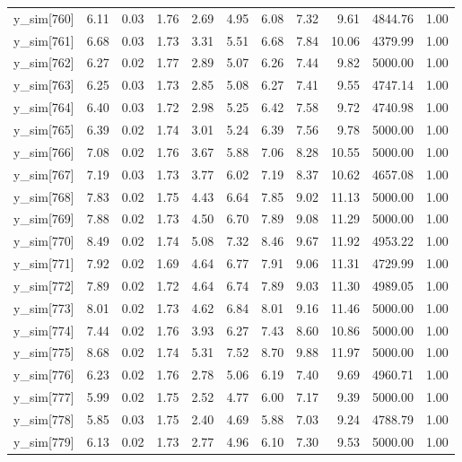 \begin{table}[ht]
\begin{tabular}{rrrrrrrrrrr}
  y\_sim[760] & 6.11 & 0.03 & 1.76 & 2.69 & 4.95 & 6.08 & 7.32 & 9.61 & 4844.76 & 1.00 \\ 
  y\_sim[761] & 6.68 & 0.03 & 1.73 & 3.31 & 5.51 & 6.68 & 7.84 & 10.06 & 4379.99 & 1.00 \\ 
  y\_sim[762] & 6.27 & 0.02 & 1.77 & 2.89 & 5.07 & 6.26 & 7.44 & 9.82 & 5000.00 & 1.00 \\ 
  y\_sim[763] & 6.25 & 0.03 & 1.73 & 2.85 & 5.08 & 6.27 & 7.41 & 9.55 & 4747.14 & 1.00 \\ 
  y\_sim[764] & 6.40 & 0.03 & 1.72 & 2.98 & 5.25 & 6.42 & 7.58 & 9.72 & 4740.98 & 1.00 \\ 
  y\_sim[765] & 6.39 & 0.02 & 1.74 & 3.01 & 5.24 & 6.39 & 7.56 & 9.78 & 5000.00 & 1.00 \\ 
  y\_sim[766] & 7.08 & 0.02 & 1.76 & 3.67 & 5.88 & 7.06 & 8.28 & 10.55 & 5000.00 & 1.00 \\ 
  y\_sim[767] & 7.19 & 0.03 & 1.73 & 3.77 & 6.02 & 7.19 & 8.37 & 10.62 & 4657.08 & 1.00 \\ 
  y\_sim[768] & 7.83 & 0.02 & 1.75 & 4.43 & 6.64 & 7.85 & 9.02 & 11.13 & 5000.00 & 1.00 \\ 
  y\_sim[769] & 7.88 & 0.02 & 1.73 & 4.50 & 6.70 & 7.89 & 9.08 & 11.29 & 5000.00 & 1.00 \\ 
  y\_sim[770] & 8.49 & 0.02 & 1.74 & 5.08 & 7.32 & 8.46 & 9.67 & 11.92 & 4953.22 & 1.00 \\ 
  y\_sim[771] & 7.92 & 0.02 & 1.69 & 4.64 & 6.77 & 7.91 & 9.06 & 11.31 & 4729.99 & 1.00 \\ 
  y\_sim[772] & 7.89 & 0.02 & 1.72 & 4.64 & 6.74 & 7.89 & 9.03 & 11.30 & 4989.05 & 1.00 \\ 
  y\_sim[773] & 8.01 & 0.02 & 1.73 & 4.62 & 6.84 & 8.01 & 9.16 & 11.46 & 5000.00 & 1.00 \\ 
  y\_sim[774] & 7.44 & 0.02 & 1.76 & 3.93 & 6.27 & 7.43 & 8.60 & 10.86 & 5000.00 & 1.00 \\ 
  y\_sim[775] & 8.68 & 0.02 & 1.74 & 5.31 & 7.52 & 8.70 & 9.88 & 11.97 & 5000.00 & 1.00 \\ 
  y\_sim[776] & 6.23 & 0.02 & 1.76 & 2.78 & 5.06 & 6.19 & 7.40 & 9.69 & 4960.71 & 1.00 \\ 
  y\_sim[777] & 5.99 & 0.02 & 1.75 & 2.52 & 4.77 & 6.00 & 7.17 & 9.39 & 5000.00 & 1.00 \\ 
  y\_sim[778] & 5.85 & 0.03 & 1.75 & 2.40 & 4.69 & 5.88 & 7.03 & 9.24 & 4788.79 & 1.00 \\ 
  y\_sim[779] & 6.13 & 0.02 & 1.73 & 2.77 & 4.96 & 6.10 & 7.30 & 9.53 & 5000.00 & 1.00 \\ 

\end{tabular}
\end{table}

